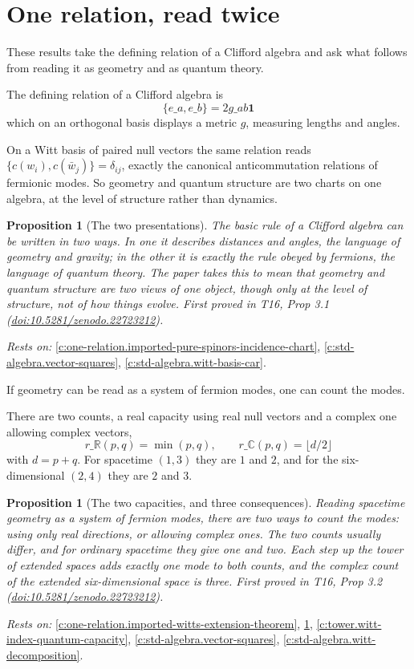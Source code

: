 \documentclass[11pt]{article}
\newtheorem{proposition}[theorem]{Proposition}
\theoremstyle{definition}
\theoremstyle{plain}
\providecommand{\C}{}\renewcommand{\C}{\mathbb{C}}
\providecommand{\R}{}\renewcommand{\R}{\mathbb{R}}
\begin{document}
\section{One relation, read twice}

These results take the defining relation of a Clifford algebra and ask what follows from reading it as geometry and as quantum theory.

The defining relation of a Clifford algebra is \[ \{e\_{a}, e\_{b}\} = 2g\_{ab}\mathbf{1} \] which on an orthogonal basis displays a metric $g$, measuring lengths and angles.

On a Witt basis of paired null vectors the same relation reads $\{c(w_{i}), c(\bar{w}_{j})\} = \delta_{ij}$, exactly the canonical anticommutation relations of fermionic modes. So geometry and quantum structure are two charts on one algebra, at the level of structure rather than dynamics.

\begin{proposition}[The two presentations]\label{c:one-relation.two-presentations}
The basic rule of a Clifford algebra can be written in two ways. In one it describes distances and angles, the language of geometry and gravity; in the other it is exactly the rule obeyed by fermions, the language of quantum theory. The paper takes this to mean that geometry and quantum structure are two views of one object, though only at the level of structure, not of how things evolve.
\emph{First proved in} T16, Prop 3.1 (\href{https://doi.org/10.5281/zenodo.22723212}{doi:10.5281/zenodo.22723212}).
\end{proposition}
\noindent\emph{Rests on:} \ref{c:one-relation.imported-pure-spinors-incidence-chart}, \ref{c:std-algebra.vector-squares}, \ref{c:std-algebra.witt-basis-car}.

If geometry can be read as a system of fermion modes, one can count the modes.

There are two counts, a real capacity using real null vectors and a complex one allowing complex vectors, \[ r\_{\R}(p,q) = \min(p,q), \qquad r\_{\C}(p,q) = \lfloor d/2 \rfloor \] with $d = p + q$. For spacetime $(1,3)$ they are $1$ and $2$, and for the six-dimensional $(2,4)$ they are $2$ and $3$.

\begin{proposition}[The two capacities, and three consequences]\label{c:one-relation.two-capacities-three-consequences}
Reading spacetime geometry as a system of fermion modes, there are two ways to count the modes: using only real directions, or allowing complex ones. The two counts usually differ, and for ordinary spacetime they give one and two. Each step up the tower of extended spaces adds exactly one mode to both counts, and the complex count of the extended six-dimensional space is three.
\emph{First proved in} T16, Prop 3.2 (\href{https://doi.org/10.5281/zenodo.22723212}{doi:10.5281/zenodo.22723212}).
\end{proposition}
\noindent\emph{Rests on:} \ref{c:one-relation.imported-witts-extension-theorem}, \ref{c:one-relation.two-presentations}, \ref{c:tower.witt-index-quantum-capacity}, \ref{c:std-algebra.vector-squares}, \ref{c:std-algebra.witt-decomposition}.
\end{document}
